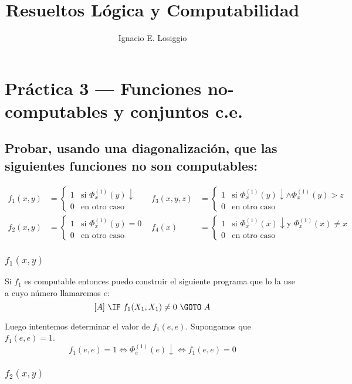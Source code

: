 \documentclass[fleqn, 11pt]{article}
\title{Resueltos Lógica y Computabilidad}
\author{Ignacio E. Losiggio}
\newcommand{\ddef}{\downarrow}
\begin{document}
\maketitle
\section{Práctica 3 --- Funciones no-computables y conjuntos c.e.}

\subsection{Probar, usando una diagonalización, que las siguientes funciones no
son computables:}

\begin{align*}
	f_1(x, y) &=
	\begin{cases}
		1 & \text{si } \Phi^{(1)}_x(y) \ddef \\
		0 & \text{en otro caso}
	\end{cases}
	&f_3(x, y, z) &=
	\begin{cases}
		1 & \text{si } \Phi^{(1)}_x(y) \ddef
		    \land \Phi^{(1)}_x(y) > z \\
		0 & \text{en otro caso}
	\end{cases} \\
	f_2(x, y) &=
	\begin{cases}
		1 & \text{si } \Phi^{(1)}_x(y) = 0 \\
		0 & \text{en otro caso}
	\end{cases}
	&f_4(x) &=
	\begin{cases}
		1 & \text{si } \Phi^{(1)}_x(x) \ddef
		    \text{y } \Phi^{(1)}_x(x) \neq x \\
		0 & \text{en otro caso}
	\end{cases}
\end{align*}

\subsubsection{$f_1(x, y)$}

Si $f_1$ es computable entonces puedo construir el siguiente programa que lo
la use a cuyo número llamaremos $e$:
\[
	[A]\ \IF\ f_1(X_1, X_1) \neq 0\ \GOTO\ A
\]

Luego intentemos determinar el valor de $f_1(e, e)$. Supongamos que $f_1(e, e)
= 1$.
\[
	f_1(e, e) = 1
	\iff \Phi^{(1)}_e(e) \ddef
	\iff f_1(e, e) = 0
\]

\subsubsection{$f_2(x, y)$}
\end{document}

